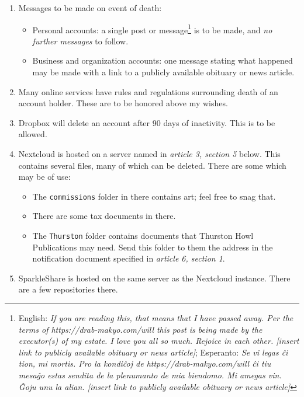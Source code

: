 \begin{enumerate}
\def\labelenumi{\arabic{enumi}.}
\tightlist
\item
  Messages to be made on event of death:

  \begin{itemize}
  \tightlist
  \item
    Personal accounts: a single post or message\footnote{English: \emph{If you are reading this, that means that I have passed away. Per the terms of https://drab-makyo.com/will this post is being made by the executor(s) of my estate. I love you all so much. Rejoice in each other. {[}insert link to publicly available obituary or news article{]}}; Esperanto: \emph{Se vi legas ĉi tion, mi mortis. Pro la kondiĉoj de https://drab-makyo.com/will ĉi tiu mesaĝo estas sendita de la plenumanto de mia biendomo. Mi amegas vin. Ĝoju unu la alian. {[}insert link to publicly available obituary or news article{]}}} is to be made, and \emph{no further messages} to follow.
  \item
    Business and organization accounts: one message stating what happened may be made with a link to a publicly available obituary or news article.
  \end{itemize}
\item
  Many online services have rules and regulations surrounding death of an account holder. These are to be honored above my wishes.
\item
  Dropbox will delete an account after 90 days of inactivity. This is to be allowed.
\item
  Nextcloud is hosted on a server named in \emph{article 3, section 5} below. This contains several files, many of which can be deleted. There are some which may be of use:

  \begin{itemize}
  \tightlist
  \item
    The \texttt{commissions} folder in there contains art; feel free to snag that.
  \item
    There are some tax documents in there.
  \item
    The \texttt{Thurston} folder contains documents that Thurston Howl Publications may need. Send this folder to them the address in the notification document specified in \emph{article 6, section 1}.
  \end{itemize}
\item
  SparkleShare is hosted on the same server as the Nextcloud instance. There are a few repositories there.


\end{enumerate}
